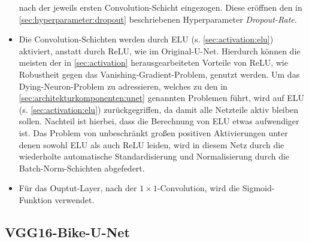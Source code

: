 \begin{itemize}
	nach der jeweils ersten Convolution-Schicht eingezogen. Diese eröffnen den in \autoref{sec:hyperparameter:dropout} 
    beschriebenen Hyperparameter \textit{Dropout-Rate}.
	\item Die Convolution-Schichten werden durch \ac{ELU} (s. \autoref{sec:activation:elu}) aktiviert, 
	anstatt durch \ac{ReLU}, wie im Original-U-Net. 
	Hierdurch können die meisten der in \autoref{sec:activation} herausgearbeiteten Vorteile von \ac{ReLU},
	wie Robustheit gegen das Vanishing-Gradient-Problem, genutzt werden.  
	Um das Dying-Neuron-Problem zu adressieren, welches zu den in \autoref{sec:architekturkomponenten:unet} genannten Problemen führt, 
	wird auf \ac{ELU} (s. \autoref{sec:activation:elu}) zurückgegriffen, da damit alle Netzteile aktiv bleiben sollen. 
	Nachteil ist hierbei, dass die Berechnung von \ac{ELU} etwas aufwendiger ist. 
	Das Problem von unbeschränkt großen positiven Aktivierungen unter denen sowohl \ac{ELU} als auch \ac{ReLU} leiden,
	wird in diesem Netz durch die wiederholte automatische Standardisierung und Normalisierung durch die Batch-Norm-Schichten abgefedert.
	\item Für das Ouptut-Layer, nach der $1\times 1$-Convolution, wird die Sigmoid-Funktion verwendet. 
\end{itemize}

\subsection{VGG16-Bike-U-Net}

